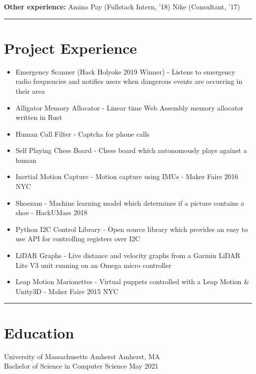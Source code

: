 \documentclass[10pt]{article}
\begin{document}
\begin{flushleft}


    \textbf{Other experience:} Amino Pay (Fullstack Intern, '18) Nike (Consultant, '17)

	\rule{\columnwidth}{0.4pt}

\section{Project Experience}
    \begin{itemize}
        \item Emergency Scanner (Hack Holyoke 2019 Winner) - Listens to emergency radio frequencies and notifies users when dangerous events are occurring in their area

        \item Alligator Memory Allocator - Linear time Web Assembly memory allocator written in Rust
    
		\item Human Call Filter - Captcha for phone calls

		\item Self Playing Chess Board - Chess board which autonomously plays against a human

		\item Inertial Motion Capture - Motion capture using IMUs - Maker Faire 2016 NYC

		\item Shoezam - Machine learning model which determines if a picture contains a shoe - HackUMass 2018

		\item Python I2C Control Library - Open source library which provides an easy to use API for controlling 
			registers over I2C

		\item LiDAR Graphs - Live distance and velocity graphs from a Garmin LiDAR Lite V3 unit running on an 
			Omega micro controller

		\item Leap Motion Marionettes - Virtual puppets controlled with a Leap Motion \& Unity3D - Maker Faire 2015 NYC
	\end{itemize}

	\rule{\columnwidth}{0.4pt}

\section{Education}
	University of Massachusetts Amherst \hfill Amherst, MA \\
	Bachelor of Science in Computer Science \hfill May 2021 \\


\end{flushleft}
\end{document}

